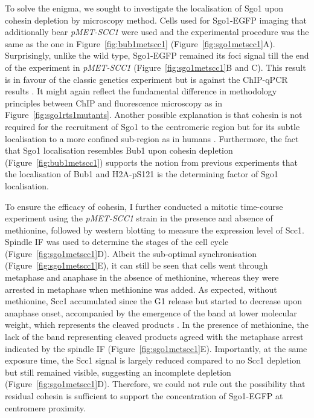 To solve the enigma, we sought to investigate the localisation of Sgo1 upon cohesin depletion by microscopy method. Cells used for Sgo1-EGFP imaging that additionally bear \textit{pMET-SCC1} were used and the experimental procedure was the same as the one in Figure~\ref{fig:bub1metscc1} (Figure~\ref{fig:sgo1metscc1}A). Surprisingly, unlike the wild type, Sgo1-EGFP remained its foci signal till the end of the experiment in \textit{pMET-SCC1} (Figure~\ref{fig:sgo1metscc1}B and C). This result is in favour of the classic genetics experiment \citep{Indjeian2005a} but is against the ChIP-qPCR results \citep{Verzijlbergen2014}. It might again reflect the fundamental difference in methodology principles between ChIP and fluorescence microscopy as in Figure~\ref{fig:sgo1rts1mutants}. Another possible explanation is that cohesin is not required for the recruitment of Sgo1 to the centromeric region but for its subtle localisation to a more confined sub-region as in humans \citep{Liu2013a}. Furthermore, the fact that Sgo1 localisation resembles Bub1 upon cohesin depletion (Figure~\ref{fig:bub1metscc1}) supports the notion from previous experiments that the localisation of Bub1 and H2A-pS121 is the determining factor of Sgo1 localisation. 

To ensure the efficacy of cohesin, I further conducted a mitotic time-course experiment using the \textit{pMET-SCC1} strain in the presence and absence of methionine, followed by western blotting to measure the expression level of Scc1. Spindle IF was used to determine the stages of the cell cycle (Figure~\ref{fig:sgo1metscc1}D). Albeit the sub-optimal synchronisation (Figure~\ref{fig:sgo1metscc1}E), it can still be seen that cells went through metaphase and anaphase in the absence of methionine, whereas they were arrested in metaphase when methionine was added. As expected, without methionine, Scc1 accumulated since the G1 release but started to decrease upon anaphase onset, accompanied by the emergence of the band at lower molecular weight, which represents the cleaved products \citep{Alexandru2001PhosphorylationYeast}. In the presence of methionine, the lack of the band representing cleaved products agreed with the metaphase arrest indicated by the spindle IF (Figure~\ref{fig:sgo1metscc1}E). Importantly, at the same exposure time, the Scc1 signal is largely reduced compared to no Scc1 depletion but still remained visible, suggesting an incomplete depletion (Figure~\ref{fig:sgo1metscc1}D). Therefore, we could not rule out the possibility that residual cohesin is sufficient to support the concentration of Sgo1-EGFP at centromere proximity. 

